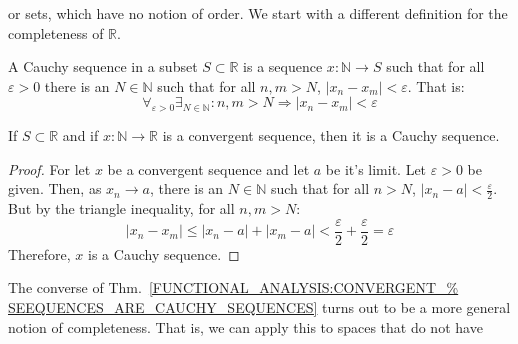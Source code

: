 \documentclass[crop=false,class=book,oneside]{standalone}
\begin{document}
            or sets, which have no notion of
            order. We start with a different definition
            for the completeness of $\mathbb{R}$.
            \begin{definition}
                A Cauchy sequence in a subset
                $S\subset\mathbb{R}$ is a
                sequence $x:\mathbb{N}\rightarrow{S}$
                such that for all $\varepsilon>0$ there
                is an $N\in\mathbb{N}$ such that for all
                $n,m>N$, $|x_{n}-x_{m}|<\varepsilon$.
                That is:
                \begin{equation*}
                    \forall_{\varepsilon>0}
                    \exists_{N\in\mathbb{N}}:
                    n,m>N\Rightarrow
                    |x_{n}-x_{m}|<\varepsilon
                \end{equation*}
            \end{definition}
            \begin{theorem}
                \label{FUNCTIONAL_ANALYSIS:CONVERGENT_%
                       SEEQUENCES_ARE_CAUCHY_SEQUENCES}
                If $S\subset\mathbb{R}$ and if
                $x:\mathbb{N}\rightarrow\mathbb{R}$
                is a convergent sequence, then it
                is a Cauchy sequence.
            \end{theorem}
            \begin{proof}
                For let $x$ be a convergent sequence and
                let $a$ be it's limit.
                Let $\varepsilon>0$ be given. Then, as
                $x_{n}\rightarrow{a}$, there is an
                $N\in\mathbb{N}$ such that for all $n>N$,
                $|x_{n}-a|<\frac{\varepsilon}{2}$.
                But by the triangle inequality,
                for all $n,m>N$:
                \begin{equation*}
                        |x_{n}-x_{m}|\leq
                        |x_{n}-a|+|x_{m}-a|<
                        \frac{\varepsilon}{2}+
                        \frac{\varepsilon}{2}
                        =\varepsilon
                    \end{equation*}
                Therefore, $x$ is a Cauchy sequence.
            \end{proof}
            The converse of
            Thm.~\ref{FUNCTIONAL_ANALYSIS:CONVERGENT_%
                      SEEQUENCES_ARE_CAUCHY_SEQUENCES}
            turns out to be a more general notion
            of completeness. That is, we can apply
            this to spaces that do not have
\end{document}
